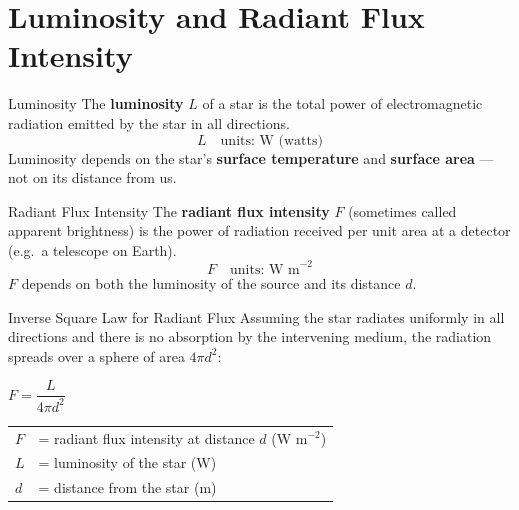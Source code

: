 

\section{Luminosity and Radiant Flux Intensity}

\begin{definitionbox}{Luminosity}
The \textbf{luminosity} $L$ of a star is the total power of electromagnetic radiation emitted by the star in all directions.
$$L \quad \text{units: W (watts)}$$
Luminosity depends on the star's \textbf{surface temperature} and \textbf{surface area} — not on its distance from us.
\end{definitionbox}

\begin{definitionbox}{Radiant Flux Intensity}
The \textbf{radiant flux intensity} $F$ (sometimes called apparent brightness) is the power of radiation received per unit area at a detector (e.g.\ a telescope on Earth).
$$F \quad \text{units: W m}^{-2}$$
$F$ depends on both the luminosity of the source and its distance $d$.
\end{definitionbox}

\begin{formulabox}{Inverse Square Law for Radiant Flux}
Assuming the star radiates uniformly in all directions and there is no absorption by the intervening medium, the radiation spreads over a sphere of area $4\pi d^2$:
\begin{center}
\Large $F = \dfrac{L}{4\pi d^2}$
\end{center}
\vspace{0.3em}
\begin{tabular}{@{}ll@{}}
$F$ & = radiant flux intensity at distance $d$ (W m$^{-2}$) \\
$L$ & = luminosity of the star (W) \\
$d$ & = distance from the star (m) \\
\end{tabular}
\end{formulabox}

